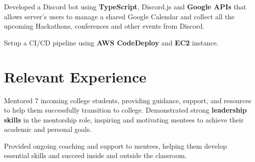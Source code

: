 \documentclass[]{DavidPietrocola-resume}
\begin{document}
\begin{minipage}[t]{0.62\textwidth}
\begin{tightemize}
\item Developed a Discord bot using {\bf TypeScript}, Discord.js and {\bf Google APIs} that allows server's users to manage a shared Google Calendar and collect all the upcoming Hackathons, conferences and other events from Discord.
\item Setup a CI/CD pipeline using {\bf AWS CodeDeploy} and {\bf EC2} instance.
\end{tightemize}



\section{Relevant Experience}
\begin{tightemize}
\item Mentored 7 incoming college students, providing guidance, support, and resources to help them successfully transition to college. Demonstrated strong {\bf leadership skills} in the mentorship role, inspiring and motivating mentees to achieve their academic and personal goals.
\item Provided ongoing coaching and support to mentees, helping them develop essential skills and succeed inside and outside the classroom.
\end{tightemize}
\end{minipage} 
\end{document}
